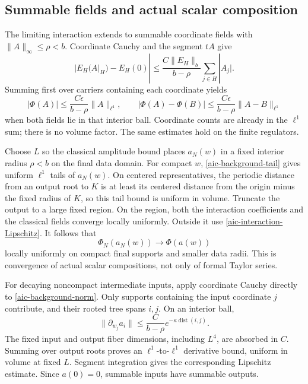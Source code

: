 \documentclass[11pt]{article}
\theoremstyle{remark}
\begin{document}
\subsection{Summable fields and actual scalar composition}
\label{aic-composition-section}

The limiting interaction extends to summable coordinate fields
with \(\|A\|_\infty\le\rho<b\). Coordinate Cauchy and the
segment \(tA\) give
\[
 |E_H(A|_H)-E_H(0)|
 \le\frac{C\|E_H\|_b}{b-\rho}
                         \sum_{j\in H}|A_j|.
\]
Summing first over carriers containing each coordinate yields
\begin{equation}
 |\Phi(A)|\le\frac{C\epsilon}{b-\rho}\|A\|_{\ell^1},
 \qquad
 |\Phi(A)-\Phi(B)|
       \le\frac{C\epsilon}{b-\rho}\|A-B\|_{\ell^1}
 \label{aic-interaction-Lipschitz}
\end{equation}
when both fields lie in that interior ball. Coordinate counts
are already in the \(\ell^1\) sum; there is no volume factor.
The same estimates hold on the finite regulators.

Choose \(L\) so the classical amplitude bound places \(a_N(w)\)
in a fixed interior radius \(\rho<b\) on the final data domain.
For compact \(w\), \eqref{aic-background-tail} gives uniform
\(\ell^1\) tails of \(a_N(w)\). On centered representatives,
the periodic distance from an output root to \(K\) is at least
its centered distance from the origin minus the fixed radius
of \(K\), so this tail bound is uniform in volume.
Truncate the output to a large fixed region. On the region,
both the interaction coefficients and the classical fields
converge locally uniformly. Outside it use
\eqref{aic-interaction-Lipschitz}. It follows that
\begin{equation}
 \Phi_N(a_N(w))\longrightarrow\Phi(a(w))
 \label{aic-substitution-limit}
\end{equation}
locally uniformly on compact final supports and smaller data
radii. This is convergence of actual scalar compositions,
not only of formal Taylor series.

For decaying noncompact intermediate inputs, apply coordinate
Cauchy directly to \eqref{aic-background-norm}. Only supports
containing the input coordinate \(j\) contribute, and their
rooted tree spans \(i,j\). On an interior ball,
\begin{equation}
 \|\partial_{w_j}a_i\|
     \le\frac{C}{b-\rho}
                   e^{-\kappa\operatorname{dist}(i,j)}.
 \label{aic-map-derivative}
\end{equation}
The fixed input and output fiber dimensions, including \(L^4\),
are absorbed in \(C\). Summing over output roots proves an
\(\ell^1\)-to-\(\ell^1\) derivative bound, uniform in volume
at fixed \(L\). Segment integration gives the corresponding
Lipschitz estimate. Since \(a(0)=0\), summable inputs have
summable outputs.
\end{document}
